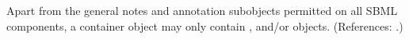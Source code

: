 Apart from the general notes and annotation subobjects permitted on all
SBML components, a \ListOfRules container object may only contain
\AssignmentRule, \AlgebraicRule and/or \RateRule objects.  (References:
.)
